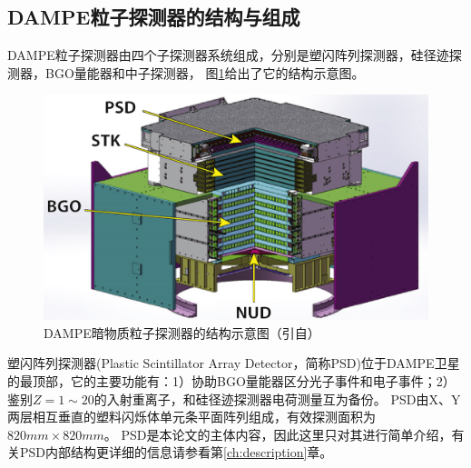 \subsection{DAMPE粒子探测器的结构与组成}
DAMPE粒子探测器由四个子探测器系统组成，分别是塑闪阵列探测器，硅径迹探测器，BGO量能器和中子探测器，
图\ref{fig:introduction:dampe_structure}给出了它的结构示意图。
\begin{figure}[htb]
	\centering
	\includegraphics[width=0.8\linewidth]{chap/introduction/fig/dampe_structure}
	\caption{DAMPE暗物质粒子探测器的结构示意图（引自\parencite{psd_tdr}）}
	\label{fig:introduction:dampe_structure}
\end{figure}


塑闪阵列探测器(Plastic Scintillator Array Detector，简称PSD)位于DAMPE卫星的最顶部，它的主要功能有：1）协助BGO量能器区分光子事件和电子事件；2）鉴别$Z=1\sim 20$的入射重离子，和硅径迹探测器电荷测量互为备份。
PSD由X、Y两层相互垂直的塑料闪烁体单元条平面阵列组成，有效探测面积为$820mm\times 820mm$。
PSD是本论文的主体内容，因此这里只对其进行简单介绍，有关PSD内部结构更详细的信息请参看第\ref{ch:description}章。

